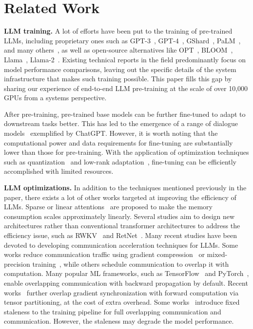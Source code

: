 \documentclass[letterpaper,twocolumn,10pt]{article}
\newcommand{\parabf}[1]{\medskip\noindent\textbf{#1}}
\newcommand{\paraf}[1]{\noindent\textbf{#1}}
\begin{document}
\section{Related Work}
\label{sec:related}

\paraf{LLM training.}
A lot of efforts have been put to the training of pre-trained LLMs, including
proprietary ones such as GPT-3~\cite{brown2020language},
GPT-4~\cite{openai2023gpt4}, GShard~\cite{lepikhin2020gshard},
PaLM~\cite{chowdhery2022palm}, and many others~\cite{askell2021general,
wei2022finetuned, smith2022using, hoffmann2022training, su2023welm}, as well as
open-source alternatives like OPT~\cite{zhang2022opt},
BLOOM~\cite{scao2022bloom}, Llama~\cite{touvron2023llama1},
Llama-2~\cite{touvron2023llama}. Existing technical reports in the field
predominantly focus on model performance comparisons, leaving out the specific
details of the system infrastructure that makes such training possible.
This paper fills this gap by sharing our experience of end-to-end LLM
pre-training at the scale of over 10,000 GPUs from a systems perspective.

After pre-training, pre-trained base models can be further fine-tuned to adapt
to downstream tasks better. This has led to the emergence of a range of dialogue
models~\cite{alpaca, vicuna2023, koala_blogpost_2023, BELLE} exemplified by
ChatGPT. However, it is worth noting that the computational power and data
requirements for fine-tuning are substantially lower than those for
pre-training. With the application of optimization techniques such as
quantization~\cite{li2020train, xiao2022smoothquant, frantar2022gptq,
dettmers2022llm} and low-rank adaptation~\cite{hu2021lora}, fine-tuning can be
efficiently accomplished with limited resources. 

\parabf{LLM optimizations.}
In addition to the techniques mentioned previously in the paper, there exists a lot of other works targeted at improving the efficiency of LLMs. Sparse or linear attentions~\cite{child2019generating, katharopoulos2020transformers, zhu2021longshort} are proposed to make the memory consumption scales approximately linearly. Several studies
aim to design new architectures rather than conventional
transformer architectures to address the efficiency issue, such as
RWKV~\cite{peng2023rwkv} and RetNet~\cite{sun2023retentive}. 
Many recent studies have been devoted to developing communication acceleration techniques for LLMs. Some works reduce communication traffic using gradient compression~\cite{alistarh2017qsgd} or mixed-precision training~\cite{DBLP:conf/iclr/MicikeviciusNAD18}, while others schedule communication to overlap it with computation. 
Many popular ML frameworks, such as TensorFlow~\cite{abadi2016tensorflow} and PyTorch~\cite{paszke2019pytorch}, enable overlapping communication with backward propagation by default.
Recent works~\cite{jayarajan2019priority, hashemi2019tictac, peng2019generic, bao2020preemptive} further overlap gradient synchronization with forward computation via tensor partitioning, at the cost of extra overhead. Some works~\cite{li2018pipe, chen2022sapipe} introduce fixed staleness to the training pipeline for full overlapping communication and communication. However, the staleness may degrade the model performance.
\end{document}
